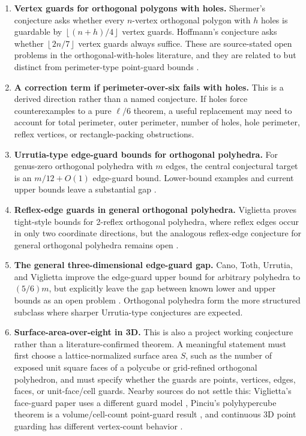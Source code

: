 \documentclass[11pt]{article}
\newcommand{\floor}[1]{\left\lfloor #1 \right\rfloor}
\begin{document}
\begin{enumerate}
  \item \textbf{Vertex guards for orthogonal polygons with holes.}
  Shermer's conjecture asks whether every $n$-vertex orthogonal polygon with
  $h$ holes is guardable by $\floor{(n+h)/4}$ vertex guards.  Hoffmann's
  conjecture asks whether $\floor{2n/7}$ vertex guards always suffice.  These
  are source-stated open problems in the orthogonal-with-holes literature, and
  they are related to but distinct from perimeter-type point-guard bounds
  \cite{UrrutiaOpenProblems,HoffmannKriegel1996,Zylinski2006,MichaelPinciu2016}.

  \item \textbf{A correction term if perimeter-over-six fails with holes.}
  This is a derived direction rather than a named conjecture.  If holes force
  counterexamples to a pure $\ell/6$ theorem, a useful replacement may need to
  account for total perimeter, outer perimeter, number of holes, hole
  perimeter, reflex vertices, or rectangle-packing obstructions.

  \item \textbf{Urrutia-type edge-guard bounds for orthogonal polyhedra.}
  For genus-zero orthogonal polyhedra with $m$ edges, the central conjectural
  target is an $m/12+O(1)$ edge-guard bound.  Lower-bound examples and current
  upper bounds leave a substantial gap \cite{VigliettaThesis,BenbernouEtAl2011}.

  \item \textbf{Reflex-edge guards in general orthogonal polyhedra.}
  Viglietta proves tight-style bounds for 2-reflex orthogonal polyhedra, where
  reflex edges occur in only two coordinate directions, but the analogous
  reflex-edge conjecture for general orthogonal polyhedra remains open
  \cite{Viglietta2020}.

  \item \textbf{The general three-dimensional edge-guard gap.}
  Cano, Toth, Urrutia, and Viglietta improve the edge-guard upper bound for
  arbitrary polyhedra to $(5/6)m$, but explicitly leave the gap between known
  lower and upper bounds as an open problem
  \cite{CanoTothUrrutiaViglietta2022}.  Orthogonal polyhedra form the more
  structured subclass where sharper Urrutia-type conjectures are expected.

  \item \textbf{Surface-area-over-eight in 3D.}
  This is also a project working conjecture rather than a literature-confirmed
  theorem.  A meaningful statement must first choose a lattice-normalized
  surface area $S$, such as the number of exposed unit square faces of a
  polycube or grid-refined orthogonal polyhedron, and must specify whether the
  guards are points, vertices, edges, faces, or unit-face/cell guards.  Nearby
  sources do not settle this: Viglietta's face-guard paper uses a different
  guard model \cite{VigliettaFace2014}, Pinciu's polyhypercube theorem is a
  volume/cell-count point-guard result \cite{Pinciu2015}, and continuous 3D
  point guarding has different vertex-count behavior
  \cite{PatersonYao1992,VigliettaThesis}.


\end{enumerate}
\end{document}
